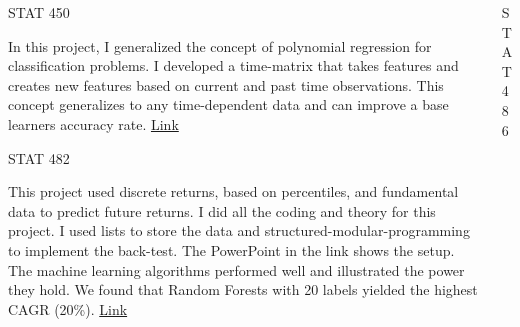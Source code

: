 \documentclass[final]{beamer}
\newlength{\onecolwid}
\newlength{\twocolwid}
\begin{document}
\begin{frame}[t]
\begin{columns}[t]
\begin{column}{\twocolwid}
\begin{columns}[t,totalwidth=\twocolwid]
\begin{column}{\onecolwid} %


\begin{block}{STAT 450}

In this project, I generalized the concept of polynomial regression for 
classification problems. I developed a time-matrix that takes features and creates 
new features based on current and past time observations. This concept generalizes to any time-dependent data and can improve a base learners accuracy rate. 
\href{https://www.dropbox.com/s/njikgukcyu9roh3/stat_450.pdf?dl=0}
{Link}

\end{block}

\begin{block}{STAT 482}

This project used discrete returns, based on 
percentiles, and fundamental data to predict future 
returns. I did all the coding and theory for this project. I used 
lists to store the data and structured-modular-programming to 
implement the back-test. The PowerPoint in the link shows the setup. 
The machine learning algorithms performed well and illustrated the 
power they hold. We found that Random Forests with 20 labels yielded 
the highest CAGR (20\%).
\href{https://www.dropbox.com/s/z7owozay8apll1y/stat-482.pdf?dl=0}
{Link}

\end{block}


\end{column} %

\begin{column}{\onecolwid} %


\begin{block}{STAT 486}


\end{block}
\end{column}
\end{columns}
\end{column}
\end{columns}
\end{frame}
\end{document}

